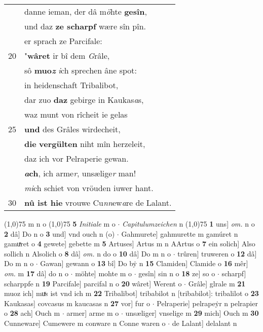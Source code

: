 \documentclass[8pt,a4paper,notitlepage]{article}
\begin{document}
\begin{table}[ht]
\begin{minipage}[t]{0.5\linewidth}
\begin{tabular}{rl}
 & danne ieman, der dâ m\textit{ö}hte \textbf{gesîn},\\ 
 & und daz \textbf{ze scharpf} wære sîn pîn.\\ 
 & er sprach ze Parcifale:\\ 
20 & "\textbf{wâret} ir bî dem \textit{G}râle,\\ 
 & sô \textbf{muo\textit{z}} \textit{i}ch sprechen âne spot:\\ 
 & in heidenschaft Tribalibot,\\ 
 & dar zuo \textbf{daz} gebirge in Kaukas\textit{a}s,\\ 
 & waz munt von rîcheit ie gelas\\ 
25 & \textbf{und} des Grâles wirdecheit,\\ 
 & \textbf{die} \textbf{vergülten} niht mîn herzeleit,\\ 
 & daz ich vor Pelraperie gewan.\\ 
 & \textbf{\textit{a}ch}, ich arme\textit{r}, unsælige\textit{r} man!\\ 
 & \textit{mi}ch schiet von vröuden iuwer hant.\\ 
30 & \textbf{nû ist hie} vrouwe Cu\textit{nn}ew\textit{a}re de Lalant.\\ 
\end{tabular}
\scriptsize
\line(1,0){75} \newline
m n o \newline
\line(1,0){75} \newline
\textbf{5} \textit{Initiale} m o   $\cdot$ \textit{Capitulumzeichen} n  \newline
\line(1,0){75} \newline
\textbf{1} uns] \textit{om.} n o \textbf{2} dâ] Do n o \textbf{3} und] vnd ouch n (o)  $\cdot$ Gahmurete] gahmurette m gamúret n gamuͯret o \textbf{4} gewete] gebette m \textbf{5} Artuses] Artus m n AArtus o \textbf{7} ein solich] Also sollich n Alsolich o \textbf{8} dâ] \textit{om.} n do o \textbf{10} dâ] Do m n o  $\cdot$ trûren] truweren o \textbf{12} dâ] Do m n o  $\cdot$ Gawan] gewann o \textbf{13} bî] Do bẏ n \textbf{15} Clamiden] Clamide o \textbf{16} mêr] \textit{om.} m \textbf{17} dâ] do n o  $\cdot$ möhte] mohte m o  $\cdot$ gesîn] sin n o \textbf{18} ze] so o  $\cdot$ scharpf] scharppfe n \textbf{19} Parcifale] parcifal n o \textbf{20} wâret] Werent o  $\cdot$ Grâle] glrale m \textbf{21} muoz ich] muͯs ist vnd ich m \textbf{22} Tribalibot] tribabilot n [tribabilot]: tribalilot o \textbf{23} Kaukasas] covcasus m kaucasas n \textbf{27} vor] fur o  $\cdot$ Pelraperie] pelrapeẏr n pelrapier o \textbf{28} ach] Ouch m  $\cdot$ armer] arme m o  $\cdot$ unsæliger] vnselige m \textbf{29} mich] Ouch m \textbf{30} Cunneware] Cumewere m conware n Conne waren o  $\cdot$ de Lalant] delalant n \newline
\end{minipage}
\end{table}
\end{document}
